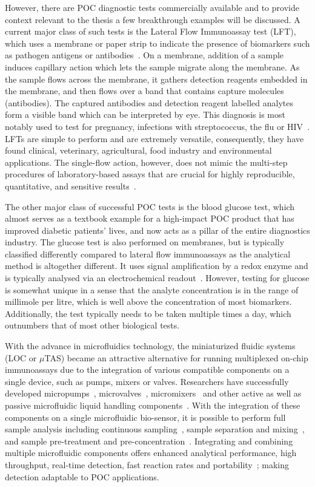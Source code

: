 However, there are POC diagnostic tests commercially available and to provide context relevant to the thesis a few breakthrough examples will be discussed. A current major class of such tests is the Lateral Flow Immunoassay test (LFT), which uses a membrane or paper strip to indicate the presence of biomarkers such as pathogen antigens or antibodies~\cite{Ching2015}. On a membrane, addition of a sample induces capillary action which lets the sample migrate along the membrane. As the sample flows across the membrane, it gathers detection reagents embedded in the membrane, and then flows over a band that contains capture molecules (antibodies). The captured antibodies and detection reagent labelled analytes form a visible band which can be interpreted by eye. This diagnosis is most notably used to test for pregnancy, infections with streptococcus, the flu or HIV~\cite{Ching2015}. LFTs are simple to perform and are extremely versatile, consequently, they have found clinical, veterinary, agricultural, food industry and environmental applications. The single-flow action, however, does not mimic the multi-step procedures of laboratory-based assays that are crucial for highly reproducible, quantitative, and sensitive results~\cite{Sia2008}.

The other major class of successful POC tests is the blood glucose test, which almost serves as a textbook example for a high-impact POC product that has improved diabetic patients' lives, and now acts as a pillar of the entire diagnostics industry. The glucose test is also performed on membranes, but is typically classified differently compared to lateral flow immunoassays as the analytical method is altogether different. It uses signal amplification by a redox enzyme and is typically analysed via an electrochemical readout~\cite{Sia2008,Luppa2011}. However, testing for glucose is somewhat unique in a sense that the analyte concentration is in the range of millimole per litre, which is well above the concentration of most biomarkers. Additionally, the test typically needs to be taken multiple times a day, which outnumbers that of most other biological tests.

With the advance in microfluidics technology, the miniaturized fluidic systems (LOC or $\mu$TAS) became an attractive alternative for running multiplexed on-chip immunoassays due to the integration of various compatible components on a single device, such as pumps, mixers or valves. Researchers have successfully developed micropumps~\cite{Yobas2008,Nisar2008,Wang2010,Das2017}, microvalves~\cite{Oh2006}, micromixers~\cite{Zhang2017,Nguyen2004} and other active as well as passive microfluidic liquid handling components~\cite{Geschke2004,Lin2010}. With the integration of these components on a single microfluidic bio-sensor, it is possible to perform full sample analysis including continuous sampling~\cite{Auroux2002}, sample separation and mixing~\cite{Manz1990}, and sample pre-treatment and pre-concentration~\cite{Stone2001}. Integrating and combining multiple microfluidic components offers enhanced analytical performance, high throughput, real-time detection, fast reaction rates and portability~\cite{Liu2010,Wu2012}; making detection adaptable to POC applications.

